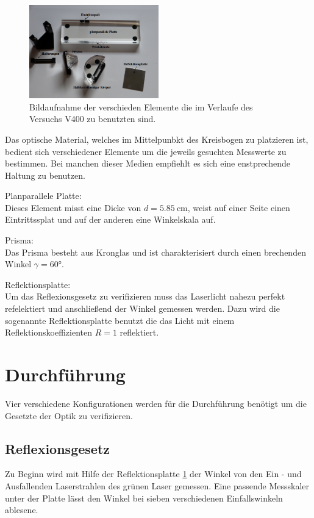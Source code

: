 \begin{figure}
    \centering
    \includegraphics[width=0.5\textwidth]{bilder/teile.png}
    \caption{Bildaufnahme der verschieden Elemente die im Verlaufe des Versuchs V400 zu benutzten sind. \cite{skript}} 
    \label{fig:teile}
\end{figure}
\FloatBarrier

Das optische Material, welches im Mittelpunbkt des Kreisbogen zu platzieren ist, bedient sich verschiedener Elemente um 
die jeweils gesuchten Messwerte zu bestimmen. Bei manchen dieser Medien empfiehlt es sich eine enstprechende Haltung zu benutzen.
\begin{description}
    \label{idkwhatthisissss}
    \item Planparallele Platte: \\
    Dieses Element misst eine Dicke von $d = \SI{5.85}{\cm}$, weist auf einer Seite einen Eintrittssplat und auf der anderen 
    eine Winkelskala auf.
    \item Prisma: \\
    Das Prisma besteht aus Kronglas und ist charakterisiert durch einen brechenden Winkel $\gamma = 60 \si{\degree}$.
    \item Reflektionsplatte: \label{lol}\\ 
    Um das Reflexionsgesetz zu verifizieren muss das Laserlicht nahezu perfekt refelektiert und anschließend der Winkel
    gemessen werden. Dazu wird die sogenannte Reflektionsplatte benutzt die das Licht mit einem Reflektionskoeffizienten $R= 1$
    reflektiert.
\end{description}
\newpage
\section{Durchführung}
Vier verschiedene Konfigurationen werden für die Durchführung benötigt um die Gesetzte der Optik zu verifizieren.

\subsection{Reflexionsgesetz}
Zu Beginn wird mit Hilfe der Reflektionsplatte \ref{fig:teile} der Winkel von den Ein - und Ausfallenden Laserstrahlen des grünen Laser gemessen. 
Eine passende Messskaler unter der Platte lässt den Winkel bei sieben verschiedenen Einfallswinkeln ablesene.

